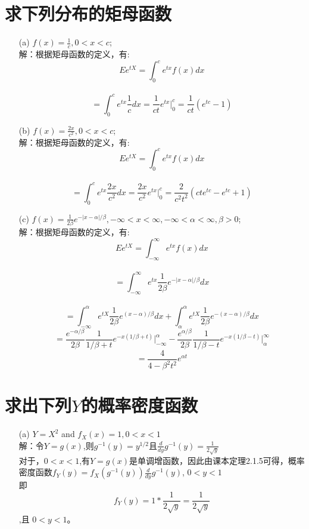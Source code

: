 \documentclass [12pt]{article}
\begin{document}
\begin{CJK*}{GBK}{kai}
\section{求下列分布的矩母函数}
\begin{enumerate}
  \item[(a)]  $f(x)=\frac{1}{c}, 0<x<c$; \\
	  解：根据矩母函数的定义，有:\\
	  $$Ee^{tX}=\int_{0}^{c}e^{tx}f(x)dx$$\\
	  $$=\int_{0}^{c}e^{tx}\frac{1}{c}dx=\frac{1}{ct}e^{tx} \vert_{0}^{c} =\frac{1}{ct}(e^{tc}-1)$$
  \item[(b)]  $f(x)=\frac{2x}{c^2},  0<x<c$;\\
  	 解：根据矩母函数的定义，有:\\
	  $$Ee^{tX}=\int_{0}^{c}e^{tx}f(x)dx$$\\
	  $$=\int_{0}^{c}e^{tx}\frac{2x}{c^2}dx=\frac{2x}{c^2}e^{tx} \vert_{0}^{c} =\frac{2}{c^2 t^2}(cte^{tc}-e^{tc}+1)$$
  \item[(c)]  $f(x)=\frac{1}{2\beta}e^{-|x-\alpha|/\beta},  -\infty<x<\infty, -\infty<\alpha<\infty,\beta>0$;\\
  	 解：根据矩母函数的定义，有:\\
	  $$Ee^{tX}=\int_{-\infty}^{\infty}e^{tx}f(x)dx$$\\
	  $$=\int_{-\infty}^{\infty}e^{tx}\frac{1}{2\beta}e^{-|x-\alpha|/\beta}dx$$\\
	  $$=\int_{-\infty}^{\alpha}e^{tX}\frac{1}{2\beta}e^{(x-\alpha)/\beta}dx+\int_{\alpha}^{\alpha}e^{tX}\frac{1}{2\beta}e^{-(x-\alpha)/\beta}dx$$
	  $$=\frac{e^{-\alpha/\beta}}{2\beta} \frac{1}{1/\beta+t} e^{-x(1/\beta+t)}\vert_{-\infty}^{\alpha}- \frac{e^{\alpha/\beta}}{2\beta} \frac{1}{1/\beta-t} e^{-x(1/\beta-t)}\vert_{\alpha}^{\infty}$$
	  $$=\frac{4}{4-\beta^2 t^2}e^{\alpha t}$$
 
  
 \end{enumerate}  

\section{求出下列$Y$的概率密度函数}
\begin{enumerate}
  \item[(a)]  $Y=X^2$ and $f_{X}(x)=1, 0<x<1$\\
  	解：令$Y=g(x)$,则$g^{-1}(y)=y^{1/2}$且$\frac{d}{dy}g^{-1}(y)=\frac{1}{2\sqrt{y}}$\\
  	对于，$0<x<1$,有$Y=g(x)$是单调增函数，因此由课本定理2.1.5可得，概率密度函数$f_{Y}(y)=f_{X}(g^{-1}(y))\frac{d}{dy}g^{-1}(y)$, $0<y<1$\\
	即$$f_{Y}(y)=1 * \frac{1}{2\sqrt{y}}= \frac{1}{2\sqrt{y}}$$,且 $0<y<1$。
	

\end{enumerate}
\end{CJK*}
\end{document}

